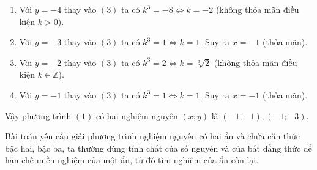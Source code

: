 \begin{bt}
{\begin{enumerate}[$ \bullet $]
			\item Với $ y=-4 $ thay vào $ (3) $ ta có $ k^3=-8\Leftrightarrow k=-2 $ (không thỏa mãn điều kiện $ k>0 $).
			\item Với $ y=-3 $  thay vào $ (3) $ ta có $ k^3=1\Leftrightarrow k=1 $. Suy ra $ x=-1 $ (thỏa mãn).
			\item Với $ y=-2 $  thay vào $ (3) $ ta có $ k^3=2\Leftrightarrow k=\sqrt[3]{2} $ (không thỏa mãn điều kiện $ k\in\mathbb{Z} $).
			\item Với $ y=-1 $  thay vào $ (3) $ ta có $ k^3=1\Leftrightarrow k=1 $. Suy ra $ x=-1 $ (thỏa mãn).
		\end{enumerate}
		Vậy phương trình $ (1) $ có hai nghiệm nguyên $ (x; y) $ là $ (-1; -1), (-1; -3) $.
	\begin{nx}
		Bài toán yêu cầu giải phương trình nghiệm nguyên có hai ẩn và chứa căn thức bậc hai, bậc ba, ta thường dùng tính chất của số nguyên và của bất đẳng thức để hạn chế miền nghiệm của một ẩn, từ đó tìm nghiệm của ẩn còn lại. 
	\end{nx}
}
\end{bt}

